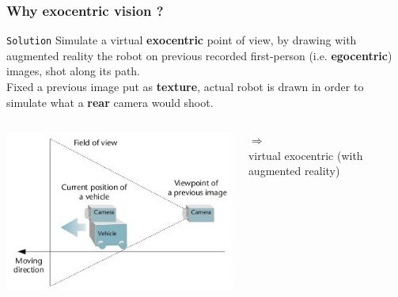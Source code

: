 \frame
{
  \frametitle{Why exocentric vision ?}

  \begin{block} {\alert{\texttt{Solution}}}
    Simulate a virtual \textbf{exocentric} point of view, by drawing with augmented reality
    the robot on previous recorded first-person (i.e. \textbf{egocentric}) images, shot along its path. \\
    \pause
    Fixed a previous image put as \textbf{texture}, actual robot is drawn in order to
    simulate what a \textbf{rear} camera would shoot.  
  \end{block}

  \pause
  
  \begin{columns}
    
     {
      \includegraphics[width=\textwidth]{img/exocentric_vision.jpg}
    }

    \pause
    
     {
      \begin{center}
        $\Longrightarrow$ \\
        \alert{virtual exocentric}
        \vskip4pt
        \scriptsize{(with augmented reality)}
      \end{center}
    }

    \pause


\end{columns}}
